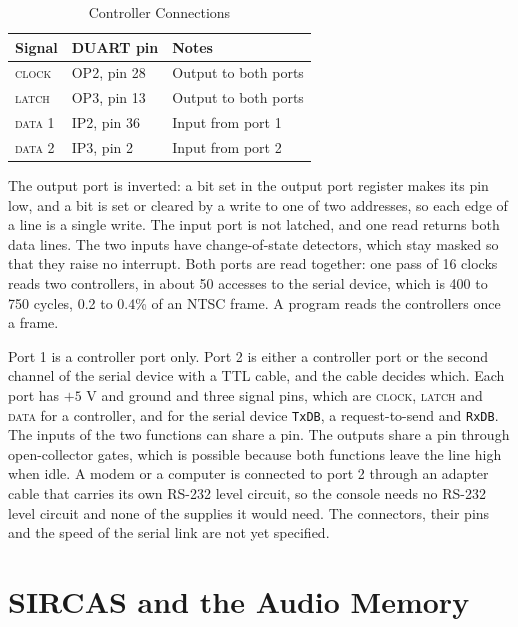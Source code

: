 \begin{table}[H]
	\centering
	\small
	\begin{tabular}{llp{6cm}}
		\toprule
		\textbf{Signal} & \textbf{DUART pin} & \textbf{Notes}       \\
		\midrule
		\textsc{clock}  & OP2, pin 28        & Output to both ports \\
		\textsc{latch}  & OP3, pin 13        & Output to both ports \\
		\textsc{data 1} & IP2, pin 36        & Input from port 1    \\
		\textsc{data 2} & IP3, pin 2         & Input from port 2    \\
		\bottomrule
	\end{tabular}
	\caption{Controller Connections}
	\label{tab:controller-nets}
\end{table}

\noindent The output port is inverted: a bit set in the output port register makes its pin low, and a bit is set or cleared
by a write to one of two addresses, so each edge of a line is a single write. The input port is not latched, and one read
returns both data lines. The two inputs have change-of-state detectors, which stay masked so that they raise no interrupt.
Both ports are read together: one pass of 16 clocks reads two controllers, in about 50 accesses to the serial device, which is
400 to 750 cycles, 0.2 to 0.4\% of an NTSC frame. A program reads the controllers once a frame.

Port 1 is a controller port only. Port 2 is either a controller port or the second channel of the serial device with a
TTL cable, and the cable decides which. Each port has $+5$ V and ground and three signal pins, which are
\textsc{clock}, \textsc{latch} and \textsc{data} for a controller, and for the serial device \texttt{TxDB}, a
request-to-send and \texttt{RxDB}. The inputs of the two functions can share a pin. The outputs share a pin through
open-collector gates, which is possible because both functions leave the line high when idle. A modem or a computer is
connected to port 2 through an adapter cable that carries its own RS-232 level circuit, so the console needs no RS-232
level circuit and none of the supplies it would need. The connectors, their pins and the speed of the serial link are
not yet specified.

\section{SIRCAS and the Audio Memory}
\label{sec:audio-memory-wiring}

